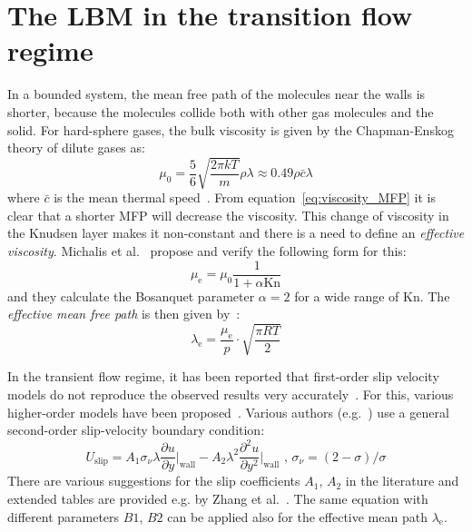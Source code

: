 \section{The LBM in the transition flow regime}
In a bounded system, the mean free path of the molecules near the walls is
shorter, because the molecules collide both with other gas molecules and the solid.
For hard-sphere gases, the bulk viscosity is given by the
Chapman-Enskog theory of dilute gases as:
\begin{equation}
 \mu_0 = \frac{5}{6} \sqrt{\frac{2\pi k T}{m}} \rho \lambda \approx 0.49 \rho \bar{c} \lambda
 \label{eq:viscosity_MFP}
\end{equation}
where $\bar{c}$ is the mean thermal speed~\cite{Michalis2010}. 
From equation~\ref{eq:viscosity_MFP} it is clear that a shorter MFP will decrease the viscosity.
This change of viscosity in the Knudsen layer makes it non-constant and there is a need
to define an \textit{effective viscosity}. Michalis et al.~\cite{Michalis2010} propose
and verify the following form for this:
\begin{equation}
 \mu_\mathrm{e} = \mu_0 \frac{1}{1 + \alpha \mathrm{Kn}}
\end{equation}
and they calculate the Bosanquet parameter $\alpha=2$ for a wide range of $\mathrm{Kn}$.
The \textit{effective mean free path} is then given by~\cite{Li2011}:
\begin{equation}
 \lambda_\mathrm{e} = \frac{\mu_\mathrm{e}}{p} \cdot \sqrt{\frac{\pi R T}{2}}
\end{equation}

In the transient flow regime, it has been reported that first-order slip velocity
models do not reproduce the observed results very accurately~\cite{Barber2006}.
For this, various higher-order models have been proposed~\cite{Zhang2012}.
Various authors (e.g.~\cite{Li2011, Neumann2012}) use a general second-order
slip-velocity boundary condition:
\begin{equation}
 U_\mathrm{slip} = A_1 \sigma_\nu \lambda \frac{\partial u}{\partial y} \Big|_\mathrm{wall} - A_2 \lambda^2 \frac{\partial^2 u}{\partial y^2} \Big|_\mathrm{wall} \textrm{ , \ } \sigma_\nu = (2 - \sigma)/\sigma
  \label{eq:slip2}
 \end{equation}
There are various suggestions for the slip coefficients $A_1$, $A_2$ in the literature
and extended tables are provided e.g. by Zhang et al.~\cite{Zhang2012}.
The same equation with different parameters $B1$, $B2$ can be applied also for the effective
mean path $\lambda_\mathrm{e}$.

